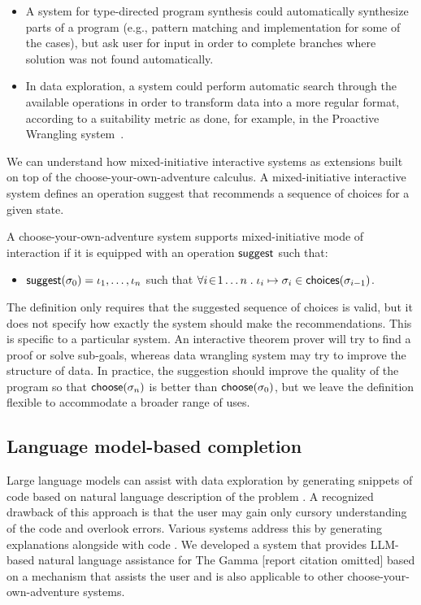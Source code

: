 \documentclass[anonymous, a4paper,UKenglish,cleveref, autoref, thm-restate]{lipics-v2021}
\newcommand{\ident}[1]{\textsf{#1}}
\newcommand{\select}{\textnormal{\ident{choose}}}
\newcommand{\suggest}{\textnormal{\ident{suggest}}}
\newcommand{\choices}{\textnormal{\ident{choices}}}
\begin{document}
\begin{itemize}
\setlength{\itemsep}{5pt}
\item A system for type-directed program synthesis could automatically synthesize parts of a
  program (e.g., pattern matching and implementation for some of the cases), but ask user for
  input in order to complete branches where solution was not found automatically.
\item In data exploration, a system could perform automatic search through the available operations
  in order to transform data into a more regular format, according to a suitability
  metric as done, for example, in the Proactive Wrangling system~\cite{guo-2011-proactive}.
\end{itemize}

We can understand how mixed-initiative interactive systems as extensions
built on top of the choose-your-own-adventure calculus. A mixed-initiative interactive system
defines an operation \ident{suggest} that recommends a sequence of choices for a given state.

\begin{definition}
A choose-your-own-adventure system supports mixed-initiative mode of interaction if it is
equipped with an operation $\suggest$ such that:
\begin{itemize}
  \item $\suggest(\sigma_0)=\iota_1, \ldots, \iota_n$ such that
    $\forall i\!\in\! 1\ldots n\;.\;\iota_i\mapsto\sigma_i\in\choices(\sigma_{i-1})$.
\end{itemize}
\end{definition}

The definition only requires that the suggested sequence of choices is valid, but it
does not specify how exactly the system should make the recommendations. This is specific to
a particular system. An interactive theorem prover will try to find a proof or solve
sub-goals, whereas data wrangling system may try to improve the structure of data.
In practice, the suggestion should improve the quality of the program so that
$\select(\sigma_n)$ is better than $\select(\sigma_0)$, but we leave the definition flexible
to accommodate a broader range of uses.

\subsection{Language model-based completion}
Large language models can assist with data exploration by generating snippets of code based
on natural language description of the problem \cite{yin-2023-codegen}. A recognized drawback of
this approach is that the user may gain only cursory understanding of the code and overlook
errors. Various systems address this by generating explanations alongside with code \cite{nooralahzadeh-2024-data}.
We developed a system that provides LLM-based natural language assistance for The Gamma [report
citation omitted] based on a mechanism that assists the user and is also applicable to other
choose-your-own-adventure systems.
\end{document}
